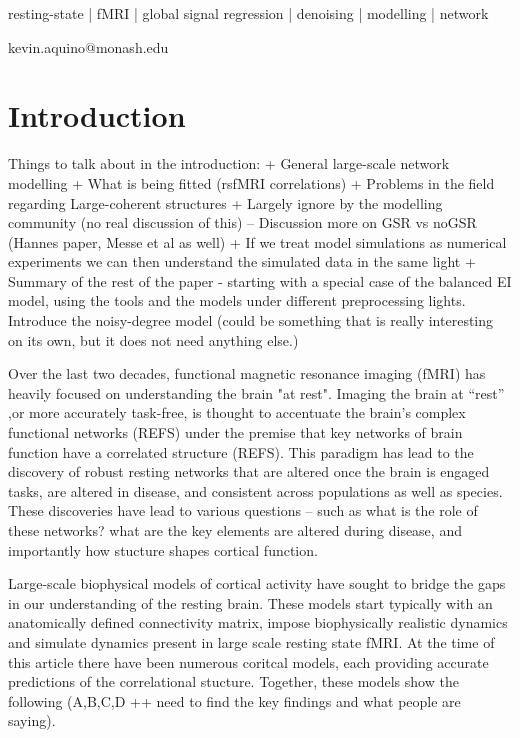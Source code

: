 \documentclass[oneside]{./zHenriquesLab-StyleBioRxiv}
\begin{document}
\begin{keywords}
resting-state | fMRI | global signal regression | denoising | modelling | network
\end{keywords}

\begin{corrauthor}
kevin.aquino@monash.edu
\end{corrauthor}


\section*{Introduction}
Things to talk about in the introduction:
+ General large-scale network modelling
+ What is being fitted (rsfMRI correlations)
+ Problems in the field regarding Large-coherent structures
+ Largely ignore by the modelling community (no real discussion of this)
	-- Discussion more on GSR vs noGSR (Hannes paper, Messe et al as well)
+ If we treat model simulations as numerical experiments we can then understand the simulated data in the same light
+ Summary of the rest of the paper - starting with a special case of the balanced EI model, using the tools and the models under different preprocessing lights. Introduce the noisy-degree model (could be something that is really interesting on its own, but it does not need anything else.)


Over the last two decades, functional magnetic resonance imaging (fMRI) has heavily focused on understanding the brain "at rest". 
Imaging the brain at ``rest'' ,or more accurately task-free,   is thought to accentuate the brain's complex functional networks (REFS) under the premise that key networks of brain function have a correlated structure (REFS). 
This paradigm has lead to the discovery of robust resting networks that are altered once the brain is engaged tasks, are altered in disease, and consistent across populations as well as species. 
These discoveries have lead to various questions -- such as what is the role of these networks? what are the key elements are altered during disease, and importantly how stucture shapes cortical function.

Large-scale biophysical models of cortical activity have sought to bridge the gaps in our understanding of the resting brain. 
These models start typically with an anatomically defined connectivity matrix, impose biophysically realistic dynamics and simulate dynamics present in large scale resting state fMRI. 
At the time of this article there have been numerous coritcal models, each providing accurate predictions of the correlational stucture. 
Together, these models show the following (A,B,C,D ++ need to find the key findings and what people are saying).
\end{document}

